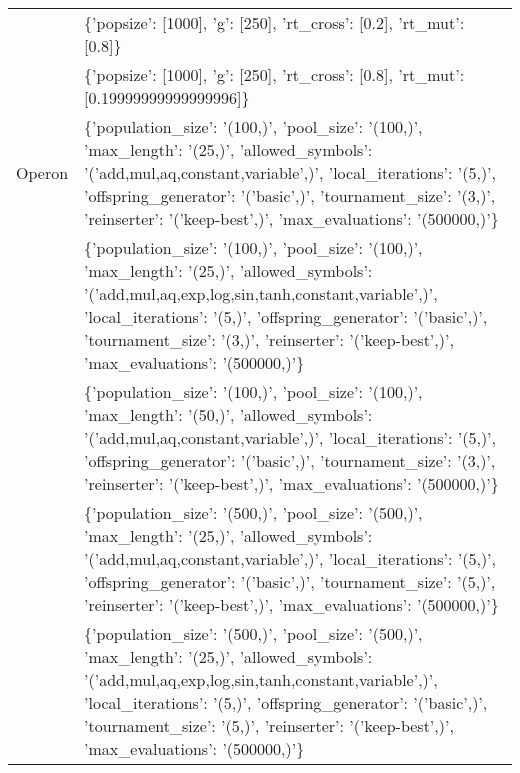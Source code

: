 \begin{tabular}{l p{37em}}
              &                                                                                                                                                                                                                                              \{'popsize': [1000], 'g': [250], 'rt\_cross': [0.2], 'rt\_mut': [0.8]\} \\
              &                                                                                                                                                                                                                              \{'popsize': [1000], 'g': [250], 'rt\_cross': [0.8], 'rt\_mut': [0.19999999999999996]\} \\
       Operon &                  \{'population\_size': '(100,)', 'pool\_size': '(100,)', 'max\_length': '(25,)', 'allowed\_symbols': '('add,mul,aq,constant,variable',)', 'local\_iterations': '(5,)', 'offspring\_generator': '('basic',)', 'tournament\_size': '(3,)', 'reinserter': '('keep-best',)', 'max\_evaluations': '(500000,)'\} \\
              & \{'population\_size': '(100,)', 'pool\_size': '(100,)', 'max\_length': '(25,)', 'allowed\_symbols': '('add,mul,aq,exp,log,sin,tanh,constant,variable',)', 'local\_iterations': '(5,)', 'offspring\_generator': '('basic',)', 'tournament\_size': '(3,)', 'reinserter': '('keep-best',)', 'max\_evaluations': '(500000,)'\} \\
              &                  \{'population\_size': '(100,)', 'pool\_size': '(100,)', 'max\_length': '(50,)', 'allowed\_symbols': '('add,mul,aq,constant,variable',)', 'local\_iterations': '(5,)', 'offspring\_generator': '('basic',)', 'tournament\_size': '(3,)', 'reinserter': '('keep-best',)', 'max\_evaluations': '(500000,)'\} \\
              &                  \{'population\_size': '(500,)', 'pool\_size': '(500,)', 'max\_length': '(25,)', 'allowed\_symbols': '('add,mul,aq,constant,variable',)', 'local\_iterations': '(5,)', 'offspring\_generator': '('basic',)', 'tournament\_size': '(5,)', 'reinserter': '('keep-best',)', 'max\_evaluations': '(500000,)'\} \\
              & \{'population\_size': '(500,)', 'pool\_size': '(500,)', 'max\_length': '(25,)', 'allowed\_symbols': '('add,mul,aq,exp,log,sin,tanh,constant,variable',)', 'local\_iterations': '(5,)', 'offspring\_generator': '('basic',)', 'tournament\_size': '(5,)', 'reinserter': '('keep-best',)', 'max\_evaluations': '(500000,)'\} \\

\end{tabular}
